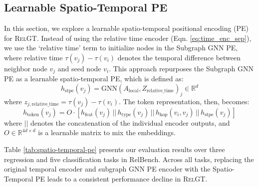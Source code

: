 \documentclass{article} %
\newcommand{\RelGT}{\textsc{RelGT}\xspace}
\begin{document}
\subsection{Learnable Spatio-Temporal PE}
In this section, we explore a learnable spatio-temporal positional encoding (PE) for \RelGT. Instead of using the relative time encoder (Eqn. \ref{eq:time_enc_sep}), we use the `relative time' term to initialize nodes in the Subgraph GNN PE, where relative time $\tau(v_j) - \tau(v_i)$ denotes the temporal difference between neighbor node $v_j$ and seed node $v_i$. This approach repurposes the Subgraph GNN PE as a learnable spatio-temporal PE, which is defined as:
\begin{equation}
  h_{\text{stpe}}(v_j) = \text{GNN}(A_{\text{local}}, Z_{\text{relative\_time}})_j \in \mathbb{R}^d \label{eq:spatio_temporal_pe_enc_sep}
\end{equation}
where $z_{j, \text{relative\_time}} = \tau(v_j) - \tau(v_i)$. The token representation, then, becomes:
\begin{equation}
    {h}_{\text{token}}(v_j) = O \cdot \left[{h}_{\text{feat}}(v_j) \, || \, {h}_{\text{type}}(v_j) \, || \, {h}_{\text{hop}}(v_i, v_j) \, || \,  {h}_{\text{stpe}}(v_j)\right]
    \label{eq:spatio_temporal_pe_token_combine}
\end{equation}
where $||$ denotes the concatenation of the individual encoder outputs, and $O \in \mathbb{R}^{4d \times d}$ is a learnable matrix to mix the embeddings.

Table \ref{tab:spatio-temporal-pe} presents our evaluation results over three regression and five classification tasks in RelBench. Across all tasks, replacing the original temporal encoder and subgraph GNN PE encoder with the Spatio-Temporal PE leads to a consistent performance decline in \RelGT.
\end{document}
